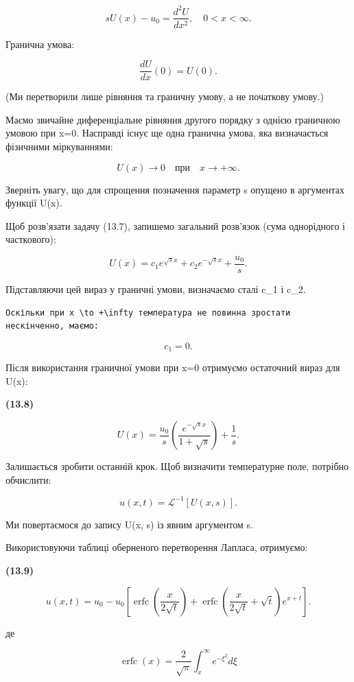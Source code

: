\documentclass[
  ukrainian,
]{article}
\begin{document}
\[
sU(x) - u_0 = \frac{d^2U}{dx^2}, \quad 0 < x < \infty.
\]

Гранична умова:

\[
\frac{dU}{dx}(0) = U(0).
\]

(Ми перетворили лише рівняння та граничну умову, а не початкову умову.)

Маємо звичайне диференціальне рівняння другого порядку з однією
граничною умовою при x=0. Насправді існує ще одна гранична умова, яка
визначається фізичними міркуваннями:

\[
U(x) \to 0 \quad \text{при} \quad x \to +\infty.
\]

Зверніть увагу, що для спрощення позначення параметр s опущено в
аргументах функції U(x).

Щоб розв'язати задачу (13.7), запишемо загальний розв'язок (сума
однорідного і часткового):

\[
U(x) = c_1 e^{\sqrt{s}x} + c_2 e^{-\sqrt{s}x} + \frac{u_0}{s}.
\]

Підставляючи цей вираз у граничні умови, визначаємо сталі c\_1 і c\_2.

\begin{verbatim}
Оскільки при x \to +\infty температура не повинна зростати нескінченно, маємо:
\end{verbatim}

\[
c_1 = 0.
\]

Після використання граничної умови при x=0 отримуємо остаточний вираз
для U(x):

\textbf{(13.8)}

\[
U(x) = \frac{u_0}{s} \left( \frac{e^{-\sqrt{s}x}}{1 + \sqrt{s}} \right) + \frac{1}{s}.
\]

Залишається зробити останній крок. Щоб визначити температурне поле,
потрібно обчислити:

\[
u(x, t) = \mathcal{L}^{-1}[U(x, s)].
\]

Ми повертаємося до запису U(x, s) із явним аргументом s.

Використовуючи таблиці оберненого перетворення Лапласа, отримуємо:

\textbf{(13.9)}

\[
u(x, t) = u_0 - u_0 \left[ \operatorname{erfc}\!\left( \frac{x}{2\sqrt{t}} \right) + \operatorname{erfc}\!\left( \frac{x}{2\sqrt{t}} + \sqrt{t} \right) e^{x+t} \right].
\]

де

\[
\operatorname{erfc}(x) = \frac{2}{\sqrt{\pi}} \int_{x}^{\infty} e^{-\xi^2} d\xi
\]
\end{document}
